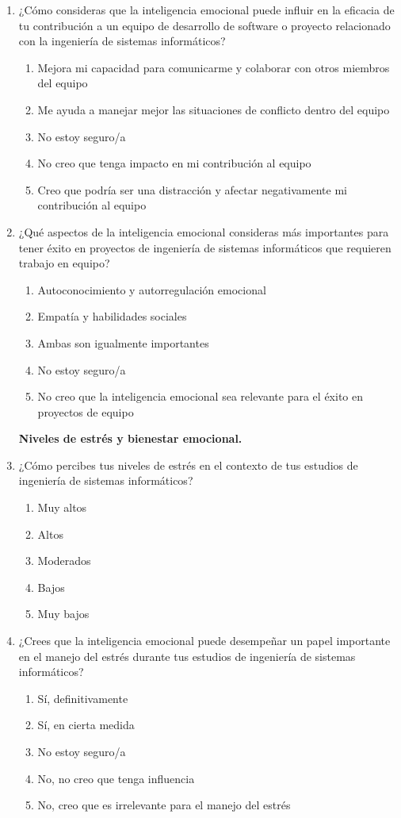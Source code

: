 \documentclass[journal]{IEEEtran}
\begin{document}
\begin{enumerate}
	\item ¿Cómo consideras que la inteligencia emocional puede influir en la eficacia de tu contribución a un equipo de desarrollo de software o proyecto relacionado con la ingeniería de sistemas informáticos?
	\begin{enumerate}
		\item Mejora mi capacidad para comunicarme y colaborar con otros miembros del equipo
		\item Me ayuda a manejar mejor las situaciones de conflicto dentro del equipo
		\item No estoy seguro/a
		\item No creo que tenga impacto en mi contribución al equipo
		\item Creo que podría ser una distracción y afectar negativamente mi contribución al equipo
	\end{enumerate}
	
	\item ¿Qué aspectos de la inteligencia emocional consideras más importantes para tener éxito en proyectos de ingeniería de sistemas informáticos que requieren trabajo en equipo?
	\begin{enumerate}
		\item Autoconocimiento y autorregulación emocional
		\item Empatía y habilidades sociales
		\item Ambas son igualmente importantes
		\item No estoy seguro/a
		\item No creo que la inteligencia emocional sea relevante para el éxito en proyectos de equipo
	\end{enumerate}
	\begin{center}
	\textbf{Niveles de estrés y bienestar emocional.}
	\end{center}
	\item ¿Cómo percibes tus niveles de estrés en el contexto de tus estudios de ingeniería de sistemas informáticos?
	\begin{enumerate}
		\item Muy altos
		\item Altos
		\item Moderados
		\item Bajos
		\item Muy bajos
	\end{enumerate}
	
	\item ¿Crees que la inteligencia emocional puede desempeñar un papel importante en el manejo del estrés durante tus estudios de ingeniería de sistemas informáticos?
	\begin{enumerate}
		\item Sí, definitivamente
		\item Sí, en cierta medida
		\item No estoy seguro/a
		\item No, no creo que tenga influencia
		\item No, creo que es irrelevante para el manejo del estrés
	\end{enumerate}
	

\end{enumerate}
\end{document}
